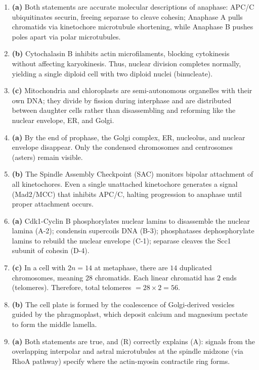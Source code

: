 \documentclass[11pt,a4paper]{article}
\begin{document}
\begin{enumerate}[label=\textbf{\arabic*.}, leftmargin=*]
\item \textbf{(a)} Both statements are accurate molecular descriptions of anaphase: APC/C ubiquitinates securin, freeing separase to cleave cohesin; Anaphase A pulls chromatids via kinetochore microtubule shortening, while Anaphase B pushes poles apart via polar microtubules.

\item \textbf{(b)} Cytochalasin B inhibits actin microfilaments, blocking cytokinesis without affecting karyokinesis. Thus, nuclear division completes normally, yielding a single diploid cell with two diploid nuclei (binucleate).

\item \textbf{(c)} Mitochondria and chloroplasts are semi-autonomous organelles with their own DNA; they divide by fission during interphase and are distributed between daughter cells rather than disassembling and reforming like the nuclear envelope, ER, and Golgi.

\item \textbf{(a)} By the end of prophase, the Golgi complex, ER, nucleolus, and nuclear envelope disappear. Only the condensed chromosomes and centrosomes (asters) remain visible.

\item \textbf{(b)} The Spindle Assembly Checkpoint (SAC) monitors bipolar attachment of all kinetochores. Even a single unattached kinetochore generates a signal (Mad2/MCC) that inhibits APC/C, halting progression to anaphase until proper attachment occurs.

\item \textbf{(a)} Cdk1-Cyclin B phosphorylates nuclear lamins to disassemble the nuclear lamina (A-2); condensin supercoils DNA (B-3); phosphatases dephosphorylate lamins to rebuild the nuclear envelope (C-1); separase cleaves the Scc1 subunit of cohesin (D-4).

\item \textbf{(c)} In a cell with $2n = 14$ at metaphase, there are $14$ duplicated chromosomes, meaning $28$ chromatids. Each linear chromatid has $2$ ends (telomeres). Therefore, total telomeres $= 28 \times 2 = 56$.

\item \textbf{(b)} The cell plate is formed by the coalescence of Golgi-derived vesicles guided by the phragmoplast, which deposit calcium and magnesium pectate to form the middle lamella.

\item \textbf{(a)} Both statements are true, and (R) correctly explains (A): signals from the overlapping interpolar and astral microtubules at the spindle midzone (via RhoA pathway) specify where the actin-myosin contractile ring forms.


\end{enumerate}
\end{document}
